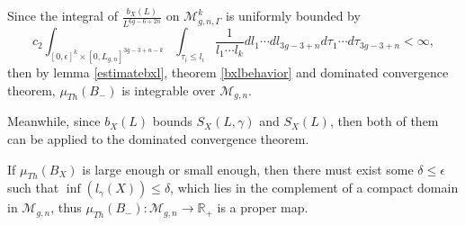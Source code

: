 Since the integral of $\frac{b_X(L)}{L^{6g-6+2n}}$ on $\mathscr{M}_{g,n,\Gamma}^k$ is uniformly bounded by 
$$
c_2\int_{[0,\epsilon]^k\times [0,L_{g,n}]^{3g-3+n-k}}\int_{\tau_i\leq l_i}\frac{1}{l_1\cdots l_k}dl_1\cdots dl_{3g-3+n} d\tau_1\cdots d\tau_{3g-3+n}< \infty,
$$
then by lemma \ref{estimatebxl}, theorem \ref{bxlbehavior} and dominated convergence theorem, $\mu_{Th}(B_{-})$ is integrable over $\mathscr{M}_{g,n}$.

Meanwhile, since $b_X(L)$ bounds $S_X(L,\gamma)$ and $S_X(L)$, then both of them can be applied to the dominated  convergence theorem. 

If $\mu_{Th}(B_X)$ is large enough or small enough, then there must exist some $\delta\leq \epsilon$ such that $\inf({l_\gamma(X)})\leq\delta$,  which lies in the complement of  a compact domain in $\mathscr{M}_{g,n}$, thus $\mu_{Th}(B_{-}):\mathscr{M}_{g,n}\to \mathbb{R}_+$ is a  proper map.


